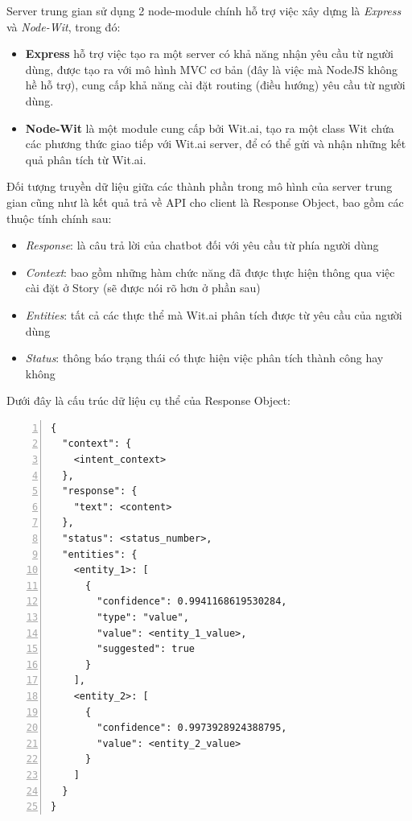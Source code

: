 \documentclass[12pt]{report}
\begin{document}
Server trung gian sử dụng 2 node-module chính hỗ trợ việc xây dựng là \textit{Express} và \textit{Node-Wit}, trong đó:

\begin{itemize}
	\item \textbf{Express} hỗ trợ việc tạo ra một server có khả năng nhận yêu cầu từ người dùng, được tạo ra với mô hình MVC cơ bản (đây là việc mà NodeJS không hề hỗ trợ), cung cấp khả năng cài đặt routing (điều hướng) yêu cầu từ người dùng.
	\item \textbf{Node-Wit} là một module cung cấp bởi Wit.ai, tạo ra một class Wit chứa các phương thức giao tiếp với Wit.ai server, để có thể gửi và nhận những kết quả phân tích từ Wit.ai.
\end{itemize}

Đối tượng truyền dữ liệu giữa các thành phần trong mô hình của server trung gian cũng như là kết quả trả về API cho client là Response Object, bao gồm các thuộc tính chính sau:

\begin{itemize}
	\item \textit{Response}: là câu trả lời của chatbot đối với yêu cầu từ phía người dùng
	\item \textit{Context}: bao gồm những hàm chức năng đã được thực hiện thông qua việc cài đặt ở Story (sẽ được nói rõ hơn ở phần sau)
	\item \textit{Entities}: tất cả các thực thể mà Wit.ai phân tích được từ yêu cầu của người dùng
	\item \textit{Status}: thông báo trạng thái có thực hiện việc phân tích thành công hay không
\end{itemize}

Dưới đây là cấu trúc dữ liệu cụ thể của Response Object:

\begin{lstlisting}[frame=lines, basicstyle=\footnotesize\ttfamily, numbers=left, numberstyle=\tiny\color{black},caption= {Cấu trúc một API trả về}, backgroundcolor=\color{background}]
{
  "context": {
    <intent_context>
  },
  "response": {
    "text": <content>
  },
  "status": <status_number>,
  "entities": {
    <entity_1>: [
      {
        "confidence": 0.9941168619530284,
        "type": "value",
        "value": <entity_1_value>,
        "suggested": true
      }
    ],
    <entity_2>: [
      {
        "confidence": 0.9973928924388795,
        "value": <entity_2_value>
      }
    ]
  }
}
\end{lstlisting}
\end{document}
